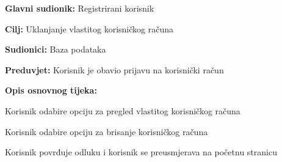 \noindent {}
\begin{packed_item}

	\item \textbf{Glavni sudionik: }Registrirani korisnik
	\item  \textbf{Cilj:} Uklanjanje vlastitog korisničkog računa
	\item  \textbf{Sudionici:} Baza podataka
	\item  \textbf{Preduvjet:} Korisnik je obavio prijavu na korisnički račun
	\item  \textbf{Opis osnovnog tijeka:}

	\item[] \begin{packed_enum}

		\item Korisnik odabire opciju za pregled vlastitog korisničkog računa
		\item Korisnik odabire opciju za brisanje korisničkog računa
		\item Korisnik povrđuje odluku i korisnik se preusmjerava na početnu stranicu
	\end{packed_enum}
\end{packed_item}


